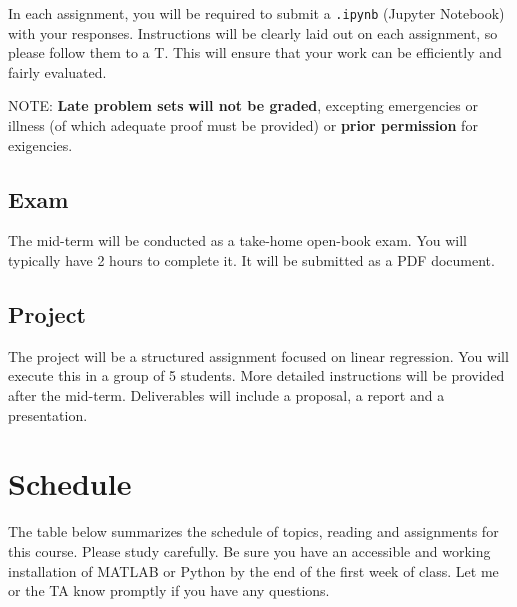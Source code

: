 \documentclass[11pt,twoside]{article}
\numberwithin{equation}{section}
\newcommand{\?}{\stackrel{?}{=}}
\newcommand{\rd}{\color{red}}
\begin{document}
In each assignment, you will be required to submit a %
\texttt{.ipynb} (Jupyter Notebook) with your responses.
Instructions will be clearly laid out on each assignment, so please follow them to a T.  This will ensure that your work
can be efficiently and fairly evaluated.

NOTE: {\rd \bf Late problem sets} \textbf{will not be graded}, excepting emergencies or illness (of which adequate proof must be provided) or {\bf  prior permission} for exigencies. 


\subsection{Exam}
The mid-term will be conducted as a  take-home open-book exam. You will typically have 2 hours to complete it.
It will be submitted as a PDF document.

\subsection{Project}
The project will be a structured assignment focused on linear regression. 
You will execute this in a group of 5 students.
More detailed instructions will be provided after the mid-term.
Deliverables will include a proposal, a report and a presentation.










\section{Schedule}
The table below summarizes the schedule of topics, reading and assignments for this course.
Please study carefully.
Be sure you have an accessible and working installation of MATLAB or Python by the end of the first week of class.
Let me or the TA know promptly if you have any questions.
\end{document}
